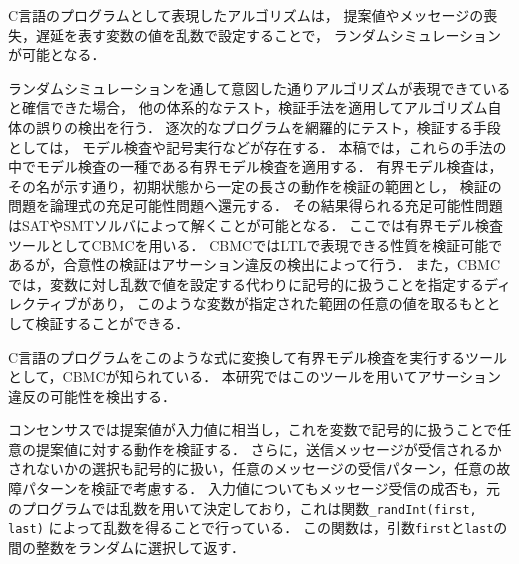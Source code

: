 \documentclass[technicalreport]{ieicej}
\theoremstyle{plain}
\begin{document}
C言語のプログラムとして表現したアルゴリズムは，
提案値やメッセージの喪失，遅延を表す変数の値を乱数で設定することで，
ランダムシミュレーションが可能となる．

ランダムシミュレーションを通して意図した通りアルゴリズムが表現できていると確信できた場合，
他の体系的なテスト，検証手法を適用してアルゴリズム自体の誤りの検出を行う．
逐次的なプログラムを網羅的にテスト，検証する手段としては，
モデル検査や記号実行などが存在する．
本稿では，これらの手法の中でモデル検査の一種である有界モデル検査を適用する．
有界モデル検査は，その名が示す通り，初期状態から一定の長さの動作を検証の範囲とし，
検証の問題を論理式の充足可能性問題へ還元する．
その結果得られる充足可能性問題はSATやSMTソルバによって解くことが可能となる．
ここでは有界モデル検査ツールとしてCBMCを用いる\cite{ckl2004}．
CBMCではLTLで表現できる性質を検証可能であるが，合意性の検証はアサーション違反の検出によって行う．
また，CBMCでは，変数に対し乱数で値を設定する代わりに記号的に扱うことを指定するディレクティブがあり，
このような変数が指定された範囲の任意の値を取るもととして検証することができる．

%


C言語のプログラムをこのような式に変換して有界モデル検査を実行するツールとして，CBMCが知られている\cite{ckl2004}．
本研究ではこのツールを用いてアサーション違反の可能性を検出する．


コンセンサスでは提案値が入力値に相当し，これを変数で記号的に扱うことで任意の提案値に対する動作を検証する．
さらに，送信メッセージが受信されるかされないかの選択も記号的に扱い，任意のメッセージの受信パターン，任意の故障パターンを検証で考慮する．
入力値についてもメッセージ受信の成否も，元のプログラムでは乱数を用いて決定しており，これは関数\verb|_randInt(first, last)|
によって乱数を得ることで行っている．
この関数は，引数\verb|first|と\verb|last|の間の整数をランダムに選択して返す．
\end{document}
